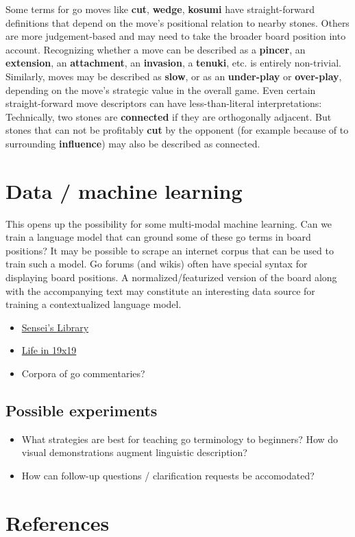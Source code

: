 \documentclass{scrartcl}
\begin{document}
Some terms for go moves like \textbf{cut}, \textbf{wedge},
\textbf{kosumi} have straight-forward definitions that depend on the
move's positional relation to nearby stones. Others are more
judgement-based and may need to take the broader board position into
account. Recognizing whether a move can be described as a
\textbf{pincer}, an \textbf{extension}, an \textbf{attachment}, an
\textbf{invasion}, a \textbf{tenuki}, etc. is entirely non-trivial.
Similarly, moves may be described as \textbf{slow}, or as an
\textbf{under-play} or \textbf{over-play}, depending on the move's
strategic value in the overall game. Even certain straight-forward move
descriptors can have less-than-literal interpretations: Technically, two
stones are \textbf{connected} if they are orthogonally adjacent. But
stones that can not be profitably \textbf{cut} by the opponent (for
example because of to surrounding \textbf{influence}) may also be
described as connected.

\section{Data / machine learning}\label{data-machine-learning}

This opens up the possibility for some multi-modal machine learning. Can
we train a language model that can ground some of these go terms in
board positions? It may be possible to scrape an internet corpus that
can be used to train such a model. Go forums (and wikis) often have
special syntax for displaying board positions. A normalized/featurized
version of the board along with the accompanying text may constitute an
interesting data source for training a contextualized language model.

\begin{itemize}
\item
  \href{https://senseis.xmp.net/?HowDiagramsWork}{Sensei's Library}
\item
  \href{https://www.lifein19x19.com/viewtopic.php?f=5\&t=226}{Life in
  19x19}
\item
  Corpora of go commentaries?
\end{itemize}

\hypertarget{possible-experiments}{%
\subsection{Possible experiments}\label{possible-experiments}}

\begin{itemize}
\item
  What strategies are best for teaching go terminology to beginners? How
  do visual demonstrations augment linguistic description?
\item
  How can follow-up questions / clarification requests be accomodated?
\end{itemize}

\section{References}
\printbibliography[heading=none]
\end{document}
